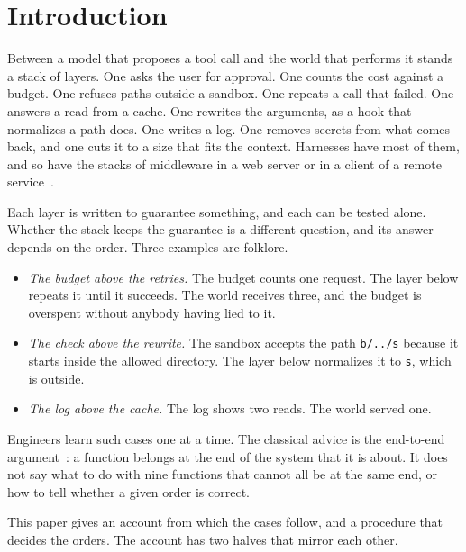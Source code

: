 \documentclass[acmsmall,nonacm,screen]{acmart}
\begin{document}
\section{Introduction}

Between a model that proposes a tool call and the world that performs it stands a stack of
layers. One asks the user for approval. One counts the cost against a budget. One refuses
paths outside a sandbox. One repeats a call that failed. One answers a read from a cache. One
rewrites the arguments, as a hook that normalizes a path does. One writes a log. One removes
secrets from what comes back, and one cuts it to a size that fits the context. Harnesses have
most of them, and so have the stacks of middleware in a web server or in a client of a remote
service~\cite{eriksen2013}.

Each layer is written to guarantee something, and each can be tested alone. Whether the stack
keeps the guarantee is a different question, and its answer depends on the order. Three
examples are folklore.
\begin{itemize}
\item \emph{The budget above the retries.} The budget counts one request. The layer below
  repeats it until it succeeds. The world receives three, and the budget is overspent without
  anybody having lied to it.
\item \emph{The check above the rewrite.} The sandbox accepts the path \texttt{b/../s} because
  it starts inside the allowed directory. The layer below normalizes it to \texttt{s}, which is
  outside.
\item \emph{The log above the cache.} The log shows two reads. The world served one.
\end{itemize}
Engineers learn such cases one at a time. The classical advice is the end-to-end
argument~\cite{saltzer1984}: a function belongs at the end of the system that it is about.
It does not say what to do with nine functions that cannot all be at the same end, or how
to tell whether a given order is correct.

This paper gives an account from which the cases follow, and a procedure that decides the
orders. The account has two halves that mirror each other.
\end{document}
